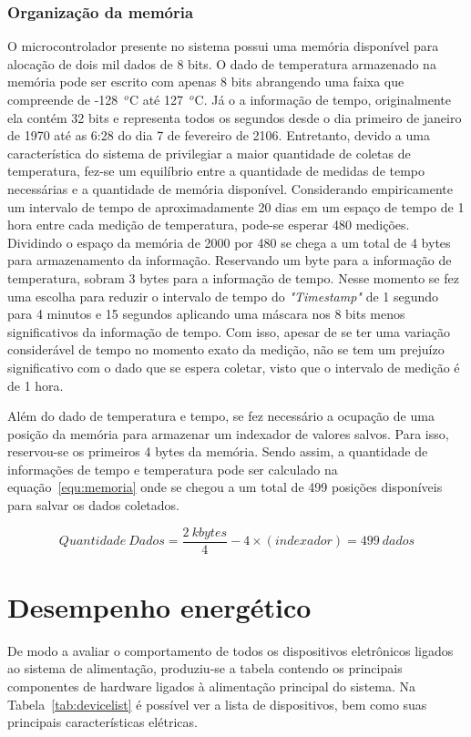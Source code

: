 \subsubsection{Organização da memória}
O microcontrolador presente no sistema possui uma memória disponível para alocação de dois mil dados de 8 bits. O dado de temperatura armazenado na memória pode ser escrito com apenas 8 bits abrangendo uma faixa que compreende de -128~$^o$C até 127~$^o$C. Já o a informação de tempo, originalmente ela contém 32 bits e representa todos os segundos desde o dia primeiro de janeiro de 1970 até as 6:28 do dia 7 de fevereiro de 2106. Entretanto, devido a uma característica do sistema de privilegiar a maior quantidade de coletas de temperatura, fez-se um equilíbrio entre a quantidade de medidas de tempo necessárias e a quantidade de memória disponível. Considerando empiricamente um intervalo de tempo de aproximadamente 20 dias em um espaço de tempo de 1 hora entre cada medição de temperatura, pode-se esperar 480 medições. Dividindo o espaço da memória de 2000 por 480 se chega a um total de 4 bytes para armazenamento da informação. Reservando um byte para a informação de temperatura, sobram 3 bytes para a informação de tempo. Nesse momento se fez uma escolha para reduzir o intervalo de tempo do \textit{"Timestamp"} de 1 segundo para 4 minutos e 15 segundos aplicando uma máscara nos 8 bits menos significativos da informação de tempo. Com isso, apesar de se ter uma variação considerável de tempo no momento exato da medição, não se tem um prejuízo significativo com o dado que se espera coletar, visto que o intervalo de medição é de 1 hora.

Além do dado de temperatura e tempo, se fez necessário a ocupação de uma posição da memória para armazenar um indexador de valores salvos. Para isso, reservou-se os primeiros 4 bytes da memória. Sendo assim, a quantidade de informações de tempo e temperatura pode ser calculado na equação~\ref{equ:memoria} onde se chegou a um total de 499 posições disponíveis para salvar os dados coletados.

\begin{equation}
    \label{equ:memoria}
    Quantidade~Dados = \frac{2~kbytes}{4} - 4\times(indexador) = 499~dados
\end{equation}


 
\section{Desempenho energético}\label{sec:desmpenho}
De modo a avaliar o comportamento de todos os dispositivos eletrônicos ligados ao sistema de alimentação, produziu-se a tabela contendo os principais componentes de hardware ligados à alimentação principal do sistema. Na Tabela~\ref{tab:devicelist} é possível ver a lista de dispositivos, bem como suas principais características elétricas.


